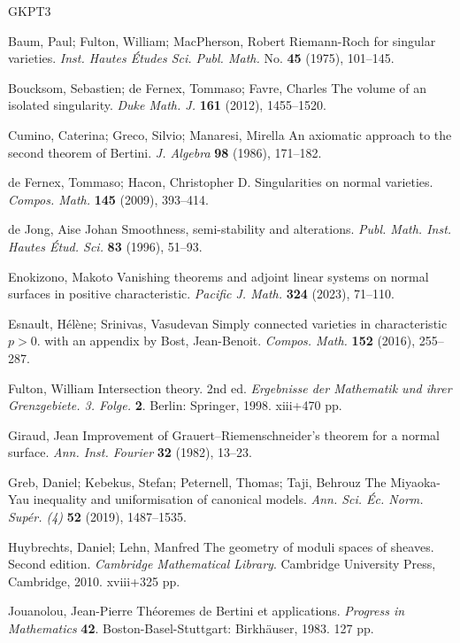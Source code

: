 \documentclass[twoside, 11pt]{article}
\theoremstyle{plain}
\theoremstyle{definition}
\theoremstyle{remark}
\begin{document}
\begin{thebibliography}{GKPT3}

 Baum, Paul; Fulton, William; MacPherson, Robert
Riemann-Roch for singular varieties.
\emph{Inst. Hautes \'Etudes Sci. Publ. Math.} No. {\bf 45} (1975), 101--145. 


 Boucksom, Sebastien; de Fernex, Tommaso; Favre, Charles 
The volume of an isolated singularity. \emph{Duke Math. J.} {\bf 161} (2012), 1455--1520. 

 Cumino, Caterina; Greco, Silvio; Manaresi, Mirella
An axiomatic approach to the second theorem of Bertini. 
\emph{J. Algebra} {\bf 98} (1986), 171--182.

 de Fernex, Tommaso; Hacon, Christopher D.
Singularities on normal varieties. \emph{Compos. Math.} {\bf 145} (2009), 393--414.


 de Jong, Aise Johan Smoothness, semi-stability and alterations. 
\emph{Publ. Math. Inst. Hautes \'Etud. Sci.} {\bf 83} (1996), 51--93.

 Enokizono, Makoto Vanishing theorems and adjoint linear systems on normal surfaces in positive characteristic. \emph{Pacific J. Math.} {\bf 324} (2023), 71--110.

 Esnault, H\'el\`ene; Srinivas, Vasudevan Simply connected varieties in characteristic $p>0$.
with an appendix by Bost, Jean-Benoit. \emph{Compos. Math. } {\bf 152} (2016),  255--287.

 Fulton, William Intersection theory. 2nd ed. 
\emph{Ergebnisse der Mathematik und ihrer Grenzgebiete. 3. Folge.} {\bf 2}. Berlin: Springer, 1998. xiii+470 pp. 


 Giraud, Jean Improvement of Grauert--Riemenschneider's theorem for a normal surface.
\emph{Ann. Inst. Fourier} {\bf 32} (1982), 13--23.


 Greb, Daniel; Kebekus, Stefan; Peternell, Thomas; Taji, Behrouz The Miyaoka-Yau inequality and uniformisation of canonical models. \emph{Ann. Sci. \'Ec. Norm. Sup\'er. (4)} 
{\bf 52} (2019), 1487--1535. 



  Huybrechts, Daniel; Lehn, Manfred The geometry of moduli spaces of sheaves. Second edition. 
\emph{Cambridge Mathematical Library}. Cambridge University Press, Cambridge, 2010. xviii+325 pp.

 Jouanolou, Jean-Pierre
Th\'eoremes de Bertini et applications. \emph{Progress in Mathematics} {\bf 42}. Boston-Basel-Stuttgart: 
Birkh\"auser, 1983. 127 pp.



\end{thebibliography}
\end{document}

